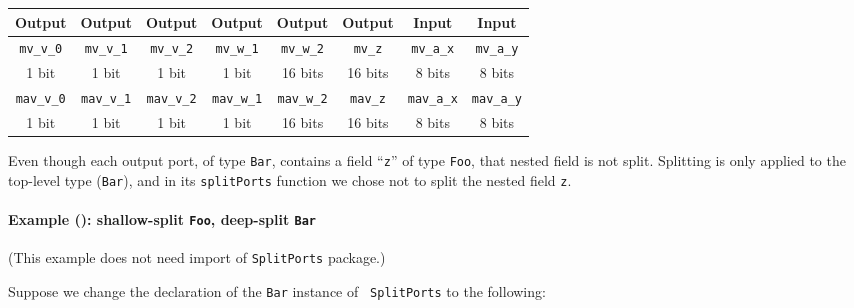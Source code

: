 \begin{center}
  \begin{tabular}{|c|c|c|c|c|c||c|c|}
    \hline
     Output &
     Output &
     Output &
     Output &
     Output &
     Output &
     Input  &
     Input  \\
    \hline
     {\tt mv\_v\_0}  &
     {\tt mv\_v\_1}  &
     {\tt mv\_v\_2}  &
     {\tt mv\_w\_1}  &
     {\tt mv\_w\_2}  &
     {\tt mv\_z}     &
     {\tt mv\_a\_x}  &
     {\tt mv\_a\_y} \\
      1 bit  &
      1 bit  &
      1 bit  &
      1 bit  &
     16 bits &
     16 bits &
      8 bits &
      8 bits \\
    \hline
     {\tt mav\_v\_0}  &
     {\tt mav\_v\_1}  &
     {\tt mav\_v\_2}  &
     {\tt mav\_w\_1}  &
     {\tt mav\_w\_2}  &
     {\tt mav\_z}     &
     {\tt mav\_a\_x}  &
     {\tt mav\_a\_y} \\
      1 bit  &
      1 bit  &
      1 bit  &
      1 bit  &
     16 bits &
     16 bits &
      8 bits &
      8 bits \\
    \hline
  \end{tabular}
\end{center}

Even though each output port, of type {\tt Bar}, contains a field
``{\tt z}'' of type {\tt Foo}, that nested field is not split.
Splitting is only applied to the top-level type ({\tt Bar}), and in
its {\tt splitPorts} function we chose not to split the nested field
{\tt z}.


\paragraph{Example (\BSV): shallow-split {\tt Foo}, deep-split {\tt Bar}}

\label{sec:splitports_examples_BSV_Foo_Shallow_Bar_Deep}

\hspace*{1em}

{\footnotesize (This example does not need import of {\tt SplitPorts} package.)}

Suppose we change the declaration of the {\tt Bar} instance of {\tt
SplitPorts} to the following:

